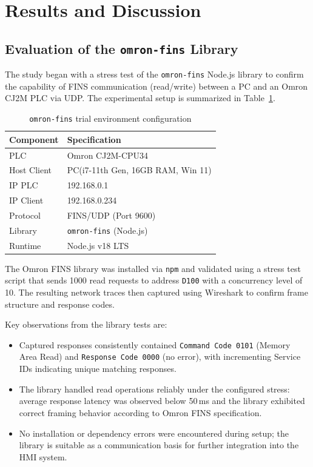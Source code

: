\section{Results and Discussion}

\subsection{Evaluation of the \texttt{omron-fins} Library}
The study began with a stress test of the \texttt{omron-fins} Node.js library to confirm the capability of FINS communication (read/write) between a PC and an Omron CJ2M PLC via UDP. The experimental setup is summarized in Table~\ref{tab:uji-fins-env}.

\begin{table}[H]
\centering
\caption{\texttt{omron-fins} trial environment configuration}
\label{tab:uji-fins-env}
\begin{tabular}{@{}ll@{}}
\toprule
\textbf{Component} & \textbf{Specification} \\ 
\midrule
PLC & Omron CJ2M-CPU34 \\ 
Host Client & PC(i7-11th Gen, 16GB RAM, Win 11) \\ 
IP PLC & 192.168.0.1 \\ 
IP Client & 192.168.0.234 \\ 
Protocol & FINS/UDP (Port 9600) \\ 
Library & \texttt{omron-fins} (Node.js) \\ 
Runtime & Node.js v18 LTS \\ 
\bottomrule
\end{tabular}
\end{table}




The Omron FINS library was installed via \texttt{npm} and validated using a stress test script that sends 1000 read requests to address \texttt{D100} with a concurrency level of 10. The resulting network traces then captured using Wireshark to confirm frame structure and response codes.

Key observations from the library tests are:
\begin{itemize}
  \item Captured responses consistently contained \texttt{Command Code 0101} (Memory Area Read) and \texttt{Response Code 0000} (no error), with incrementing Service IDs indicating unique matching responses.
  \item The library handled read operations reliably under the configured stress: average response latency was observed below 50\,ms and the library exhibited correct framing behavior according to Omron FINS specification.
  \item No installation or dependency errors were encountered during setup; the library is suitable as a communication basis for further integration into the HMI system.
\end{itemize}

